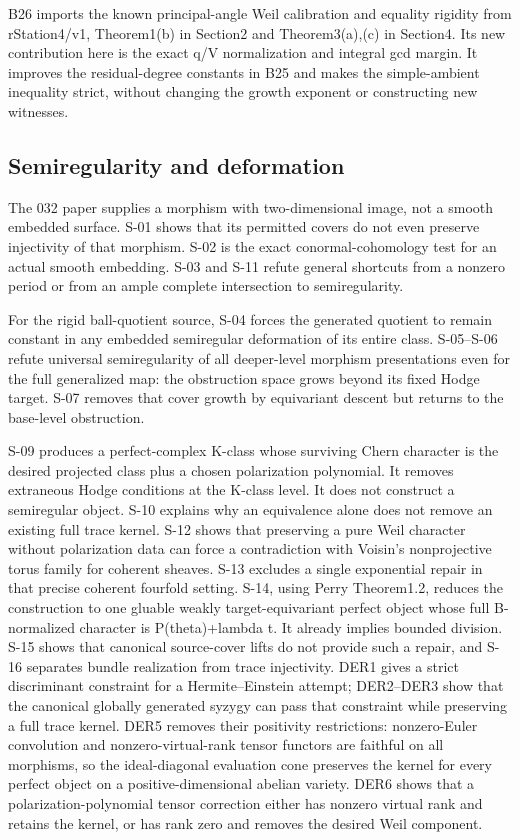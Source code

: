 \documentclass[11pt,a4paper]{article}
\theoremstyle{definition}
\begin{document}
B26 imports the known principal-angle Weil calibration and equality
rigidity from rStation4/v1, Theorem1(b) in Section2 and Theorem3(a),(c)
in Section4. Its new contribution here is the exact q/V normalization
and integral gcd margin. It improves the residual-degree constants in
B25 and makes the simple-ambient inequality strict, without changing the
growth exponent or constructing new witnesses.

\subsection{Semiregularity and
deformation}\label{IMPLICATIONS-semiregularity-and-deformation}

The 032 paper supplies a morphism with two-dimensional image, not a
smooth embedded surface. S-01 shows that its permitted covers do not
even preserve injectivity of that morphism. S-02 is the exact
conormal-cohomology test for an actual smooth embedding. S-03 and S-11
refute general shortcuts from a nonzero period or from an ample complete
intersection to semiregularity.

For the rigid ball-quotient source, S-04 forces the generated quotient
to remain constant in any embedded semiregular deformation of its entire
class. S-05--S-06 refute universal semiregularity of all deeper-level
morphism presentations even for the full generalized map: the
obstruction space grows beyond its fixed Hodge target. S-07 removes that
cover growth by equivariant descent but returns to the base-level
obstruction.

S-09 produces a perfect-complex K-class whose surviving Chern character
is the desired projected class plus a chosen polarization polynomial. It
removes extraneous Hodge conditions at the K-class level. It does not
construct a semiregular object. S-10 explains why an equivalence alone
does not remove an existing full trace kernel. S-12 shows that
preserving a pure Weil character without polarization data can force a
contradiction with Voisin's nonprojective torus family for coherent
sheaves. S-13 excludes a single exponential repair in that precise
coherent fourfold setting. S-14, using Perry Theorem1.2, reduces the
construction to one gluable weakly target-equivariant perfect object
whose full B-normalized character is P(theta)+lambda t. It already
implies bounded division. S-15 shows that canonical source-cover lifts
do not provide such a repair, and S-16 separates bundle realization from
trace injectivity. DER1 gives a strict discriminant constraint for a
Hermite--Einstein attempt; DER2--DER3 show that the canonical globally
generated syzygy can pass that constraint while preserving a full trace
kernel. DER5 removes their positivity restrictions: nonzero-Euler
convolution and nonzero-virtual-rank tensor functors are faithful on all
morphisms, so the ideal-diagonal evaluation cone preserves the kernel
for every perfect object on a positive-dimensional abelian variety. DER6
shows that a polarization-polynomial tensor correction either has
nonzero virtual rank and retains the kernel, or has rank zero and
removes the desired Weil component.
\end{document}
